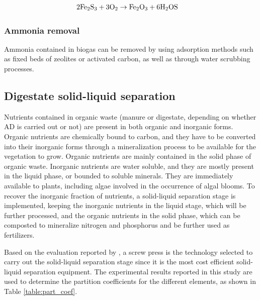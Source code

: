 \begin{refsection}[referencesApD]
\begin{align}
& 2\text{Fe\textsubscript{2}S\textsubscript{3}} + 3\text{O\textsubscript{2}} \rightarrow \text{Fe\textsubscript{2}O\textsubscript{3}} + 6\text{H\textsubscript{2}OS} \label{eq:H2SRemovalRegenerationNRecovery}
\end{align}

\subsubsection{Ammonia removal}
Ammonia contained in biogas can be removed by using adsorption methods such as fixed beds of zeolites or activated carbon, as well as through water scrubbing processes.

\subsection{Digestate solid-liquid separation} \label{section:SLSeparationNRecovery}
Nutrients contained in organic waste (manure or digestate, depending on whether AD is carried out or not) are present in both organic and inorganic forms. Organic nutrients are chemically bound to carbon, and they have to be converted into their inorganic forms through a mineralization process to be available for the vegetation to grow. Organic nutrients are mainly contained in the solid phase of organic waste. Inorganic nutrients are water soluble, and they are mostly present in the liquid phase, or bounded to soluble minerals. They are immediately available to plants, including algae involved in the occurrence of algal blooms. To recover the inorganic fraction of nutrients, a solid-liquid separation stage is implemented, keeping the inorganic nutrients in the liquid stage, which will be further processed, and the organic nutrients in the solid phase, which can be composted to mineralize nitrogen and phosphorus and be further used as fertilizers.

Based on the evaluation reported by \citet{MollerSLsep}, a screw press is the technology selected to carry out the solid-liquid separation stage since it is the most cost efficient solid-liquid separation equipment. The experimental results reported in this study are used to determine the partition coefficients for the different elements, as shown in Table \ref{table:part_coef}.


\end{refsection}
